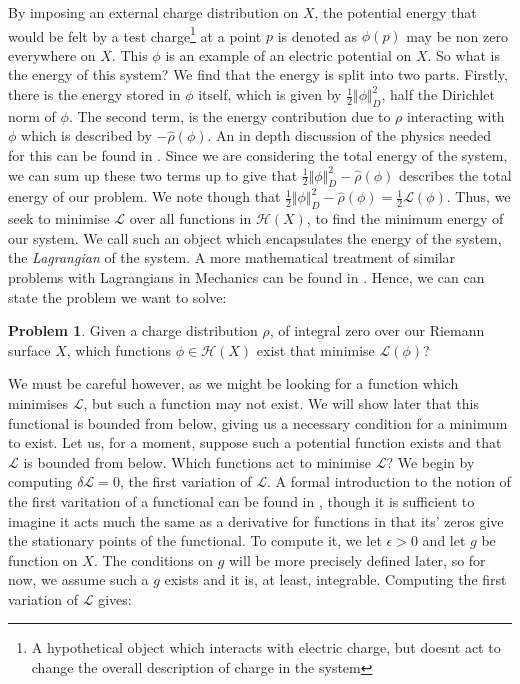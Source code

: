 \documentclass[11pt]{report}
\theoremstyle{definition}
\newtheorem*{problem}{Problem}
\begin{document}
By imposing an external charge distribution on $X$, the potential energy that would be felt by a test charge\footnote{A hypothetical object which interacts with electric charge, but doesnt act to change the overall description of charge in the system} at a point $p$ is denoted as $\phi(p)$ may be non zero everywhere on $X$. This $\phi$ is an example of an electric potential on $X$. So what is the energy of this system? We find that the energy is split into two parts. Firstly, there is the energy stored in $\phi$ itself, which is given by $\frac{1}{2}\Vert \phi \Vert^2_D$, half the Dirichlet norm of $\phi$. The second term, is the energy contribution due to $\rho$ interacting with $\phi$ which is described by $-\hat{\rho}(\phi)$. An in depth discussion of the physics needed for this can be found in \cite[(p.45-46, Chapter 1)]{electromagentismBook}. Since we are considering the total energy of the system, we can sum up these two terms up to give that $\frac{1}{2}\Vert \phi \Vert^2_D - \hat{\rho}(\phi)$ describes the total energy of our problem. We note though that $\frac{1}{2}\Vert \phi \Vert^2_D - \hat{\rho}(\phi) = \frac{1}{2}\mathcal{L}(\phi)$. Thus, we seek to minimise $\mathcal{L}$ over all functions in $\mathcal{H}(X)$, to find the minimum energy of our system. We call such an object which encapsulates the energy of the system, the \emph{Lagrangian} of the system. A more mathematical treatment of similar problems with Lagrangians in Mechanics can be found in \cite[(Chapters 6 and 12)]{arnold}. Hence, we can can state the problem we want to solve:
\begin{problem}
  Given a charge distribution $\rho$, of integral zero over our Riemann surface $X$, which functions $\phi \in \mathcal{H}(X)$ exist that minimise $\mathcal{L}(\phi)$?
\end{problem}
We must be careful however, as we might be looking for a function which minimises $\mathcal{L}$, but such a function may not exist. We will show later that this functional is bounded from below, giving us a necessary condition for a minimum to exist. Let us, for a moment, suppose such a potential function exists and that $\mathcal{L}$ is bounded from below. Which functions act to minimise $\mathcal{L}$? We begin by computing $\delta \mathcal{L}= 0 $, the first variation of $\mathcal{L}$. A formal introduction to the notion of the first varitation of a functional can be found in \cite[(p.4)]{jost}, though it is sufficient to imagine it acts much the same as a derivative for functions in that its' zeros give the stationary points of the functional. To compute it, we let $\epsilon > 0$ and let $g$ be function on $X$. The conditions on $g$ will be more precisely defined later, so for now, we assume such a $g$ exists and it is, at least, integrable. Computing the first variation of $\mathcal{L}$ gives:
\end{document}
